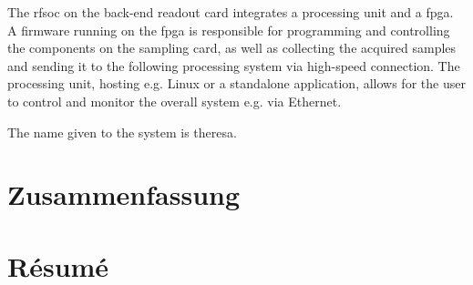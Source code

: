 The \gls{rfsoc} on the back-end readout card integrates a processing unit and a \gls{fpga}. 
A firmware running on the \gls{fpga} is responsible for programming and controlling the components on the sampling card, as well as collecting the acquired samples and sending it to the following processing system via high-speed connection.
The processing unit, hosting e.g. Linux or a standalone application, allows for the user to control and monitor the overall system e.g. via Ethernet.

The name given to the system is \gls{theresa}.
\chapter*{Zusammenfassung}
\chapter*{Résumé}